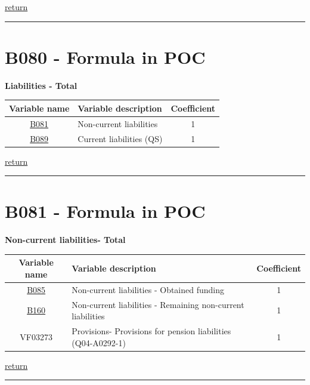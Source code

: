 \documentclass[]{book}
\begin{document}
\protect\hyperlink{equity}{return}

\begin{center}\rule{0.5\linewidth}{\linethickness}\end{center}

\hypertarget{b080---formula-in-poc}{%
\section{B080 - Formula in POC}\label{b080---formula-in-poc}}

\textbf{Liabilities - Total}

\begin{longtable}[]{@{}clc@{}}
\toprule
Variable name & Variable description & Coefficient\tabularnewline
\midrule
\endhead
\protect\hyperlink{b081---formula-in-poc}{B081} & Non-current liabilities & 1\tabularnewline
\protect\hyperlink{b089---formula-in-poc}{B089} & Current liabilities (QS) & 1\tabularnewline
\bottomrule
\end{longtable}

\protect\hyperlink{liabilities}{return}

\begin{center}\rule{0.5\linewidth}{\linethickness}\end{center}

\hypertarget{b081---formula-in-poc}{%
\section{B081 - Formula in POC}\label{b081---formula-in-poc}}

\textbf{Non-current liabilities- Total}

\begin{longtable}[]{@{}clc@{}}
\toprule
Variable name & Variable description & Coefficient\tabularnewline
\midrule
\endhead
\protect\hyperlink{b085---formula-in-poc}{B085} & Non-current liabilities - Obtained funding & 1\tabularnewline
\protect\hyperlink{b160---formula-in-poc}{B160} & Non-current liabilities - Remaining non-current liabilities & 1\tabularnewline
VF03273 & Provisions- Provisions for pension liabilities (Q04-A0292-1) & 1\tabularnewline
\bottomrule
\end{longtable}

\protect\hyperlink{liabilities}{return}

\begin{center}\rule{0.5\linewidth}{\linethickness}\end{center}
\end{document}
